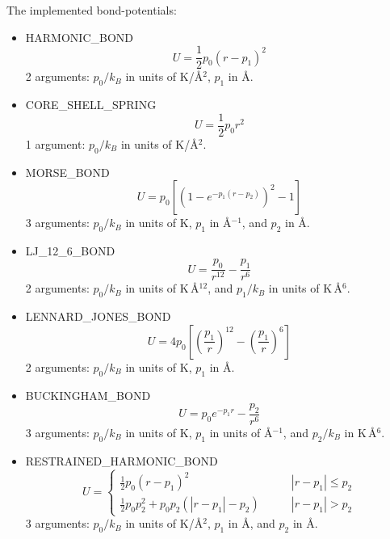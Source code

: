 \noindent
The implemented bond-potentials:
\begin{itemize}

  \item{HARMONIC\_BOND}
  \begin{equation}
  U=\frac{1}{2} p_0 \left(r-p_1\right)^2
  \end{equation}
  2 arguments: $p_0/k_B$ in units of K/\AA$^2$, $p_1$ in \AA.

  \item{CORE\_SHELL\_SPRING}
  \begin{equation}
  U=\frac{1}{2} p_0 r^2
  \end{equation}
  1 argument: $p_0/k_B$ in units of K/\AA$^2$.

  \item{MORSE\_BOND}
  \begin{equation}
  U=p_0\left[\left(1-e^{-p_1\left(r-p_2\right)}\right)^2-1\right]
  \end{equation}
  3 arguments: $p_0/k_B$ in units of K, $p_1$ in \AA$^{-1}$, and $p_2$ in \AA.

  \item{LJ\_12\_6\_BOND}
  \begin{equation}
  U=\frac{p_0}{r^{12}}-\frac{p_1}{r^{6}}
  \end{equation}
  2 arguments: $p_0/k_B$ in units of K\,\AA$^{12}$, and $p_1/k_B$ in units of K\,\AA$^6$.

  \item{LENNARD\_JONES\_BOND}
  \begin{equation}
  U=4 p_0 \left[\left(\frac{p_1}{r}\right)^{12}-\left(\frac{p_1}{r}\right)^{6}\right]
  \end{equation}
  2 arguments: $p_0/k_B$ in units of K, $p_1$ in \AA.

  \item{BUCKINGHAM\_BOND}
  \begin{equation}
  U=p_0 e^{-p_1 r}-\frac{p_2}{r^{6}}
  \end{equation}
  3 arguments: $p_0/k_B$ in units of K, $p_1$ in units of \AA$^{-1}$, and $p_2/k_B$ in K\,\AA$^6$.

  \item{RESTRAINED\_HARMONIC\_BOND}
  \begin{equation}
  U=\begin{cases}
      \frac{1}{2} p_0\left(r-p_1\right)^2 & \qquad \left|r-p_1\right|\leq p_2\\
      \frac{1}{2} p_0 p_2^2+p_0 p_2\left(\left|r-p_1\right|-p_2\right) & \qquad \left|r-p_1\right|> p_2
     \end{cases}
  \end{equation}
  3 arguments: $p_0/k_B$ in units of K/\AA$^2$, $p_1$ in \AA, and $p_2$ in \AA.


\end{itemize}
